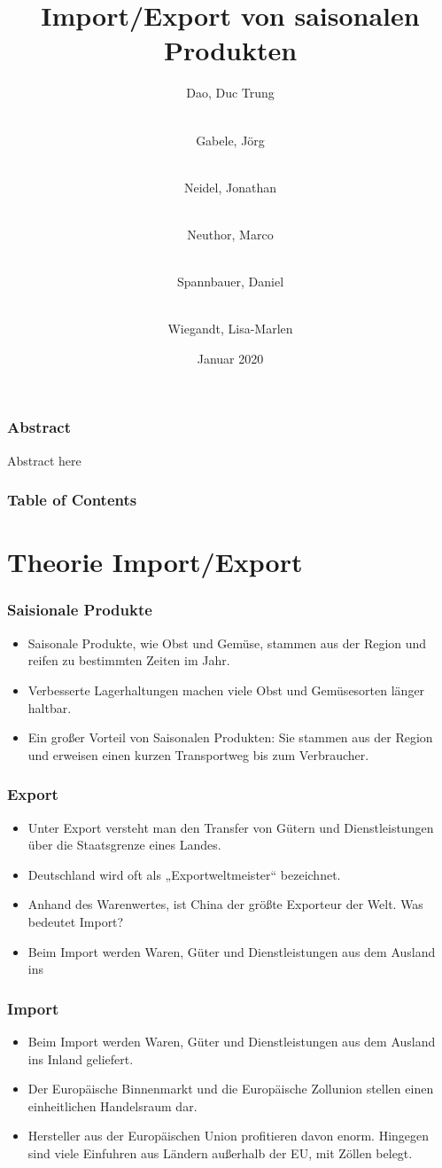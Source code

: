 \documentclass{beamer}
\title{Import/Export von saisonalen Produkten}
\author[Dao, Gabele, Neidel, Neuthor, Spannbauer, Wiegandt]{
  Dao, Duc Trung \and\\
  Gabele, Jörg \and\\
  Neidel, Jonathan \and\\
  Neuthor, Marco \and\\
  Spannbauer, Daniel \and\\
  Wiegandt, Lisa-Marlen
}
\date{Januar 2020}
\institute{HTW Berlin, Angewandte Informatik}
\begin{document}
\frame{\titlepage}

\begin{frame}
\frametitle{Abstract}
Abstract here
\end{frame}

\begin{frame}
\frametitle{Table of Contents}
\tableofcontents
\end{frame}

\section{Theorie Import/Export}

\begin{frame}
\frametitle{Saisionale Produkte}
  \begin{itemize}
    \item Saisonale Produkte, wie Obst und Gemüse, stammen
      aus der Region und reifen zu bestimmten Zeiten im Jahr.
    \item  Verbesserte Lagerhaltungen machen viele Obst und
      Gemüsesorten länger haltbar.
    \item  Ein großer Vorteil von Saisonalen Produkten: Sie
      stammen aus der Region und erweisen einen kurzen
      Transportweg bis zum Verbraucher.
  \end{itemize}
\end{frame}


\begin{frame}
\frametitle{Export}
  \begin{itemize}
    \item
Unter Export versteht man den Transfer von Gütern und Dienstleistungen über
die Staatsgrenze eines Landes.
    \item
Deutschland wird oft als „Exportweltmeister“ bezeichnet.
    \item
Anhand des Warenwertes, ist China der größte Exporteur der Welt.
Was bedeutet Import?
    \item
Beim Import werden Waren, Güter und Dienstleistungen aus dem Ausland ins
  \end{itemize}
\end{frame}

\begin{frame}
\frametitle{Import}
  \begin{itemize}
    \item Beim Import werden Waren, Güter und Dienstleistungen aus dem Ausland ins
      Inland geliefert.
    \item Der Europäische Binnenmarkt und die Europäische Zollunion stellen einen
      einheitlichen Handelsraum dar.
    \item Hersteller aus der Europäischen Union profitieren davon enorm. Hingegen sind
      viele Einfuhren aus Ländern außerhalb der EU, mit Zöllen belegt.
  \end{itemize}
\end{frame}
\end{document}
